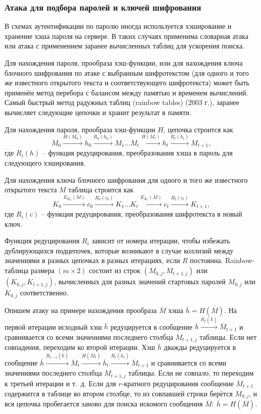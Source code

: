\documentclass[10pt,a4paper,openany]{book}
\begin{document}
\subsubsection{Атака для подбора паролей и ключей шифрования}

В схемах аутентификации по паролю иногда используется хэширование и хранение хэша пароля на сервере. В таких случаях применима словарная атака или атака с применением заранее вычисленных таблиц для ускорения поиска.

Для нахождения пароля, прообраза хэш-функции, или для нахождения ключа блочного шифрования по атаке с выбранным шифротекстом (для одного и того же известного открытого текста и соответствующего шифротекста) может быть применён метод перебора с балансом между памятью и временем вычислений. Самый быстрый метод радужных таблиц (rainbow tables) (2003 г.), заранее вычисляет следующие цепочки и хранит результат в памяти.

Для нахождения пароля, прообраза хэш-функции $H$, цепочка строится как
    \[ M_0 \xrightarrow{H(M_0)} h_0 \xrightarrow{R_0(h_0)} M_1 \ldots M_t \xrightarrow{H(M_t)} h_t \xrightarrow{R_t(h_t)} M_{t+1}, \]
где $R_i(h)$ -- функция редуцирования, преобразования хэша в пароль для следующего хэширования.

Для нахождения ключа блочного шифрования для одного и того же известного открытого текста $M$ таблица строится как
    \[ K_0 \xrightarrow{E_{K_0}(M)} c_0 \xrightarrow{R_0(c_0)} K_1 \ldots K_t \xrightarrow{E_{K_t}(M)} c_t \xrightarrow{R_t(c_t)} K_{t+1}, \]
где $R_i(c)$ -- функция редуцирования, преобразования шифротекста в новый ключ.

Функция редуцирования $R_i$ зависит от номера итерации, чтобы избежать дублирующихся подцепочек, которые возникают в случае коллизий между значениями в разных цепочках в разных итерациях, если $R$ постоянна. Rainbow-таблица размера $(m \times 2)$ состоит из строк $(M_{0,j}, M_{t+1,j})$ или $(K_{0,j}, K_{t+1,j})$, вычисленных для разных значений стартовых паролей $M_{0,j}$ или $K_{0,j}$ соответственно.

Опишем атаку на примере нахождения прообраза $\overline{M}$ хэша $\overline{h} = H(\overline{M})$. На первой итерации исходный хэш $\overline{h}$ редуцируется в сообщение $\overline{h} \xrightarrow{R_t(\overline{h})} \overline{M}_{t+1} $ и сравнивается со всеми значениями последнего столбца $M_{t+1,j}$ таблицы. Если нет совпадения, переходим ко второй итерации. Хэш $\overline{h}$ дважды редуцируется в сообщение $\overline{h} \xrightarrow{R_{t-1}(\overline{h})} \overline{M}_t \xrightarrow{H(\overline{M}_t)} \overline{h}_t \xrightarrow{R_t(\overline{h}_t)} \overline{M}_{t+1}$ и сравнивается со всеми значениями последнего столбца $M_{t+1,j}$ таблицы. Если не совпало, то переходим к третьей итерации и т.~д. Если для $r$-кратного редуцирования сообщение $\overline{M}_{t+1}$ содержится в таблице во втором столбце, то из совпавшей строки берётся $M_{0,j}$, и вся цепочка пробегается заново для поиска искомого сообщения $\overline{M}: ~ \overline{h} = H(\overline{M})$.
\end{document}
